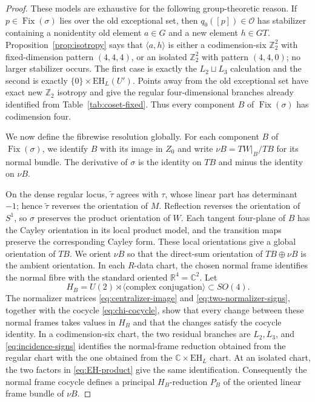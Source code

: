 \documentclass[11pt]{article}
\theoremstyle{remark}\newtheorem{remark}[theorem]{Remark}
\newcommand{\Fix}{\operatorname{Fix}}
\newcommand{\EH}{\mathrm{EH}}
\newcommand{\R}{\mathbb R}
\newcommand{\C}{\mathbb C}
\newcommand{\Z}{\mathbb Z}
\begin{document}
\begin{proof}
These models are exhaustive for the following group-theoretic reason.  If
$p\in\Fix(\sigma)$ lies over the old exceptional set, then
$q_0([p])\in\mathcal O$ has stabilizer containing a nonidentity old element
$a\in G$ and a new element $h\in GT$.  Proposition~\ref{prop:isotropy}
says that $\langle a,h\rangle$ is either a codimension-six $\Z_2^2$ with
fixed-dimension pattern $(4,4,4)$, or an isolated $\Z_2^2$ with pattern
$(4,4,0)$; no larger stabilizer occurs.  The first case is exactly the
$L_2\sqcup L_3$ calculation and the second is exactly
$\{0\}\times\EH_L(U')$.  Points away from the old exceptional set have
exact new $\Z_2$ isotropy and give the regular four-dimensional branches
already identified from Table~\ref{tab:coset-fixed}.  Thus every component
$B$ of $\Fix(\sigma)$ has codimension four.

We now define the fibrewise resolution globally.  For each component $B$
of $\Fix(\sigma)$, we identify $B$ with its image in $Z_0$ and write
$\nu B=TW|_B/TB$ for its normal bundle.  The derivative of $\sigma$ is the
identity on $TB$ and minus the identity on $\nu B$.

On the dense regular locus, $\widetilde\tau$ agrees with $\tau$, whose
linear part has determinant $-1$; hence $\widetilde\tau$ reverses the
orientation of $M$.  Reflection reverses the orientation of $S^1$, so
$\sigma$ preserves the product orientation of $W$.  Each tangent four-plane of $B$ has the
Cayley orientation in its local product model, and the transition maps
preserve the corresponding Cayley form.  These local orientations give a
global orientation of $TB$.  We orient $\nu B$ so that the direct-sum
orientation of $TB\oplus\nu B$ is the ambient orientation.  In
each $R$-data chart, the chosen normal frame identifies the normal fibre
with the standard oriented $\R^4=\C^2$.  Let
\[
 H_B=U(2)\rtimes\langle\text{complex conjugation}\rangle\subset SO(4).
\]
The normalizer matrices \eqref{eq:centralizer-image} and
\eqref{eq:two-normalizer-signs}, together with the cocycle
\eqref{eq:chi-cocycle}, show that every change between these normal frames
takes values in $H_B$ and that the changes satisfy the cocycle identity.
In a codimension-six chart, the two residual branches are $L_2,L_3$, and
\eqref{eq:incidence-signs} identifies the normal-frame reduction obtained
from the regular chart with the one obtained from the
$\C\times\EH_L$ chart.  At an isolated chart, the two factors in
\eqref{eq:EH-product} give the same identification.  Consequently the
normal frame cocycle defines a principal $H_B$-reduction $P_B$ of the
oriented linear frame bundle of $\nu B$.


\end{proof}
\end{document}
